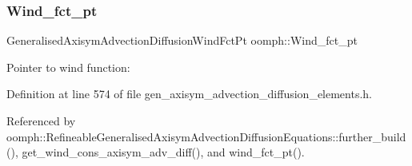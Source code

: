 \subsubsection{\texorpdfstring{Wind\+\_\+fct\+\_\+pt}{Wind\_fct\_pt}}
{\footnotesize\ttfamily Generalised\+Axisym\+Advection\+Diffusion\+Wind\+Fct\+Pt oomph\+::\+Wind\+\_\+fct\+\_\+pt\hspace{0.3cm}{\ttfamily [protected]}}



Pointer to wind function\+: 



Definition at line 574 of file gen\+\_\+axisym\+\_\+advection\+\_\+diffusion\+\_\+elements.\+h.



Referenced by oomph\+::\+Refineable\+Generalised\+Axisym\+Advection\+Diffusion\+Equations\+::further\+\_\+build(), get\+\_\+wind\+\_\+cons\+\_\+axisym\+\_\+adv\+\_\+diff(), and wind\+\_\+fct\+\_\+pt().

